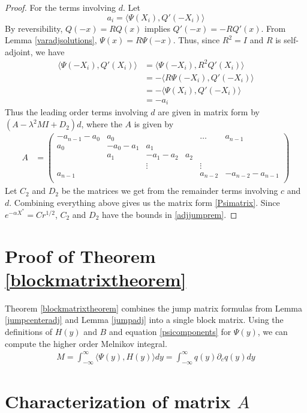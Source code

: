 \documentclass[thesis.tex]{subfiles}
\begin{document}
\begin{lemma}
\begin{proof}
For the terms involving $d$. Let
\[
a_i = \langle \Psi(X_i), Q'(-X_i) \rangle 
\]
By reversibility, $Q(-x) = R Q(x)$ implies $Q'(-x) = -R Q'(x)$. From Lemma \ref{varadjsolutions}, $\Psi(x) = R \Psi(-x)$. Thus, since $R^2 = I$ and $R$ is self-adjoint, we have
\begin{align*}
\langle \Psi(-X_i), Q'(X_i) \rangle &= \langle \Psi(-X_i), R^2 Q'(X_i) \rangle \\
&= -\langle R \Psi(-X_i), Q'(-X_i) \rangle \\
&= -\langle \Psi(X_i), Q'(-X_i) \rangle \\
&= -a_i
\end{align*}
Thus the leading order terms involving $d$ are given in matrix form by $(A - \lambda^2 M I + D_2)d$, where the $A$ is given by
\begin{align*}
A &= \begin{pmatrix}
-a_{n-1} - a_0 & a_0 & & & \dots & a_{n-1}\\
a_0 & -a_0 - a_1 &  a_1 \\
& a_1 & -a_1 - a_2 &  a_2 \\
& & \vdots & & \vdots \\
a_{n-1} & & & & a_{n-2} & -a_{n-2} - a_{n-1} \\
\end{pmatrix}
\end{align*}
Let $C_2$ and $D_2$ be the matrices we get from the remainder terms involving $c$ and $d$. Combining everything above gives us the matrix form \cref{Psimatrix}. Since $e^{-\alpha X^*} = C r^{1/2}$, $C_2$ and $D_2$ have the bounds in \cref{adjjumprem}.
\end{proof}
\end{lemma}

\section{Proof of Theorem \ref{blockmatrixtheorem}}

Theorem \ref{blockmatrixtheorem} combines the jump matrix formulas from Lemma \ref{jumpcenteradj} and Lemma \ref{jumpadj} into a single block matrix. Using the definitions of $H(y)$ and $B$ and equation \cref{psicomponents} for $\Psi(y)$, we can compute the higher order Melnikov integral.
\begin{align*}
M = \int_{-\infty}^\infty \langle \Psi(y), H(y) \rangle dy = \int_{-\infty}^\infty q(y) \partial_c q(y) dy
\end{align*}

\section{Characterization of matrix $A$}
\end{document}
